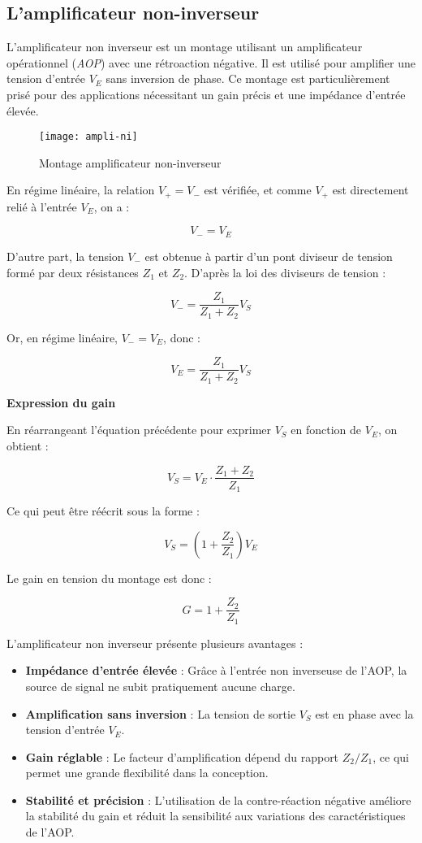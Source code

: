 \subsection{L’amplificateur non-inverseur}


L’amplificateur non inverseur est un montage utilisant un amplificateur 
opérationnel (\textit{AOP}) avec une rétroaction négative. Il est utilisé pour 
amplifier une tension d’entrée \( V_E \) sans inversion de phase. Ce montage est 
particulièrement prisé pour des applications nécessitant un gain précis et une 
impédance d’entrée élevée.

\begin{figure}[H]
    \centering
    \texttt{[image: ampli-ni]}
    \caption{Montage amplificateur non-inverseur}
    \label{fig:non-inverting}
\end{figure}


En régime linéaire, la relation \( V_+ = V_- \) est vérifiée, et comme \( V_+ \) 
est directement relié à l’entrée \( V_E \), on a :

\[
V_- = V_E
\]

D'autre part, la tension \( V_- \) est obtenue à partir d’un pont diviseur de 
tension formé par deux résistances \( Z_1 \) et \( Z_2 \). D’après la loi des 
diviseurs de tension :

\[
V_- = \frac{Z_1}{Z_1 + Z_2} V_S
\]

Or, en régime linéaire, \( V_- = V_E \), donc :

\[
V_E = \frac{Z_1}{Z_1 + Z_2} V_S
\]

\textbf{Expression du gain}

En réarrangeant l’équation précédente pour exprimer \( V_S \) en fonction de 
\( V_E \), on obtient :

\[
V_S = V_E \cdot \frac{Z_1 + Z_2}{Z_1}
\]

Ce qui peut être réécrit sous la forme :

\[
V_S = \left( 1 + \frac{Z_2}{Z_1} \right) V_E
\]

Le gain en tension du montage est donc :

\[
G = 1 + \frac{Z_2}{Z_1}
\]

L’amplificateur non inverseur présente plusieurs avantages :
\begin{itemize}
    \item \textbf{Impédance d’entrée élevée} : Grâce à l’entrée non inverseuse de l’AOP, la source de signal ne subit pratiquement aucune charge.
    \item \textbf{Amplification sans inversion} : La tension de sortie \( V_S \) est en phase avec la tension d’entrée \( V_E \).
    \item \textbf{Gain réglable} : Le facteur d’amplification dépend du rapport \( Z_2 / Z_1 \), ce qui permet une grande flexibilité dans la conception.
    \item \textbf{Stabilité et précision} : L’utilisation de la contre-réaction négative améliore la stabilité du gain et réduit la sensibilité aux variations des caractéristiques de l’AOP.
\end{itemize}

